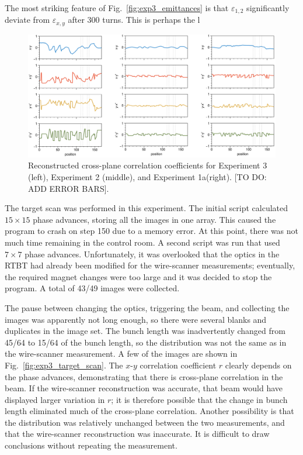 The most striking feature of Fig.~\ref{fig:exp3_emittances} is that $\varepsilon_{1,2}$ significantly deviate from $\varepsilon_{x,y}$ after 300 turns. This is perhaps the l

%
\begin{figure}[!p]
    \centering
    \vspace*{3.0cm}
    \includegraphics[width=\textwidth]{Images/chapter5/exp3/compare_corr.png}
    \caption{Reconstructed cross-plane correlation coefficients for Experiment 3 (left), Experiment 2 (middle), and Experiment 1a(right). [TO DO: ADD ERROR BARS].}
    \label{fig:exp3_compare_corr}
    \vspace*{3.0cm}
\end{figure}
%

The target scan was performed in this experiment. The initial script calculated $15 \times 15$ phase advances, storing all the images in one array. This caused the program to crash on step 150 due to a memory error. At this point, there was not much time remaining in the control room. A second script was run that used $7 \times 7$ phase advances. Unfortunately, it was overlooked that the optics in the RTBT had already been modified for the wire-scanner measurements; eventually, the required magnet changes were too large and it was decided to stop the program. A total of 43/49 images were collected.


The pause between changing the optics, triggering the beam, and collecting the images was apparently not long enough, so there were several blanks and duplicates in the image set. The bunch length was inadvertently changed from 45/64 to 15/64 of the bunch length, so the distribution was not the same as in the wire-scanner measurement. A few of the images are shown in Fig.~\ref{fig:exp3_target_scan}. The $x$-$y$ correlation coefficient $r$ clearly depends on the phase advances, demonstrating that there is cross-plane correlation in the beam. If the wire-scanner reconstruction was accurate, that beam would have displayed larger variation in $r$; it is therefore possible that the change in bunch length eliminated much of the cross-plane correlation. Another possibility is that the distribution was relatively unchanged between the two measurements, and that the wire-scanner reconstruction was inaccurate. It is difficult to draw conclusions without repeating the measurement. 

